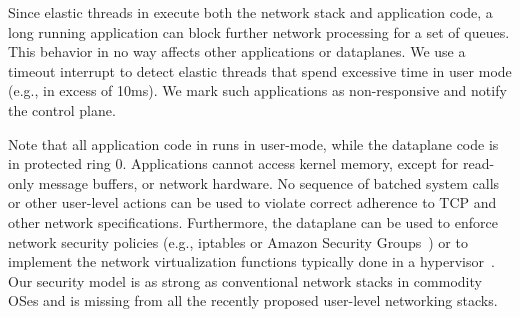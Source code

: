 Since elastic threads in \ix execute both the network stack and
application code, a long running application can block further network
processing for a set of queues. This behavior in no way affects other
applications or dataplanes. We use a timeout interrupt to
detect elastic threads that spend excessive time in user mode (e.g.,
in excess of 10ms). We mark such applications as non-responsive and notify
the control plane. %

Note that all application code in \ix runs in user-mode, while the
dataplane code is in protected ring 0. Applications cannot access
kernel memory, except for read-only message buffers, or network
hardware.  No sequence of batched system calls or other user-level
actions can be used to violate correct adherence to TCP and other
network specifications.  Furthermore, the dataplane can be used to
enforce network security policies (e.g., iptables or Amazon Security
Groups~\cite{url:amazon-sg}) or to implement the network virtualization functions typically
done in a hypervisor~\cite{nsdi:nsx}. Our security model is as strong
as conventional network stacks in commodity OSes and is missing from all
the recently proposed user-level networking stacks. 


